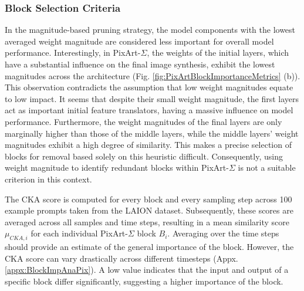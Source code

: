 \subsubsection{Block Selection Criteria}
\label{sec:ExpPixArtBlockSelectionCriterias}
In the magnitude-based pruning strategy, the model components with the lowest averaged weight magnitude are considered less important for overall model performance. Interestingly, in PixArt-$\Sigma$, the weights of the initial layers, which have a substantial influence on the final image synthesis, exhibit the lowest magnitudes across the architecture (Fig. \ref{fig:PixArtBlockImportanceMetrics} (b)). This observation contradicts the assumption that low weight magnitudes equate to low impact. It seems that despite their small weight magnitude, the first layers act as important initial feature translators, having a massive influence on model performance. Furthermore, the weight magnitudes of the final layers are only marginally higher than those of the middle layers, while the middle layers' weight magnitudes exhibit a high degree of similarity. This makes a precise selection of blocks for removal based solely on this heuristic difficult. Consequently, using weight magnitude to identify redundant blocks within PixArt-$\Sigma$ is not a suitable criterion in this context.




%	

The \gls{CKA} score is computed for every block and every sampling step across 100 example prompts taken from the LAION dataset. Subsequently, these scores are averaged across all samples and time steps, resulting in a mean similarity score $\mu_{CKA,i}$ for each individual PixArt-$\Sigma$ block $B_i$. Averaging over the time steps should provide an estimate of the general importance of the block. However, the \gls{CKA} score can vary drastically across different timesteps (Appx. \ref{appx:BlockImpAnaPix}). A low value indicates that the input and output of a specific block differ significantly, suggesting a higher importance of the block. 

